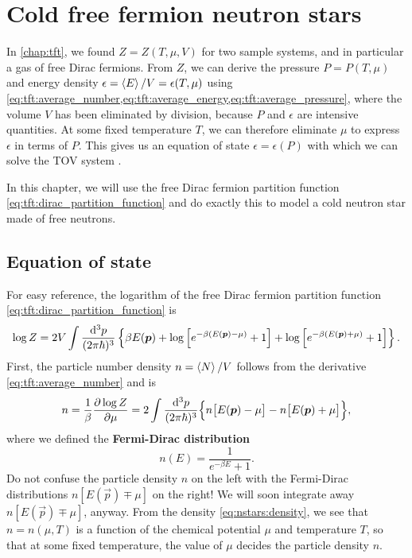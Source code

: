 \chapter{Cold free fermion neutron stars}



In \cref{chap:tft}, we found $Z = Z(T, \mu, V)$ for two sample systems, and in particular a gas of free Dirac fermions.
From $Z$, we can derive the pressure $P = P(T, \mu)$ and energy density $\epsilon = \left< E \right>/V = \epsilon(T, \mu)$ using \cref{eq:tft:average_number,eq:tft:average_energy,eq:tft:average_pressure}, where the volume $V$ has been eliminated by division, because $P$ and $\epsilon$ are intensive quantities.
At some fixed temperature $T$, we can therefore eliminate $\mu$ to express $\epsilon$ in terms of $P$.
This gives us an equation of state $\epsilon = \epsilon(P)$ with which we can solve the TOV system .

In this chapter, we will use the free Dirac fermion partition function \eqref{eq:tft:dirac_partition_function} and do exactly this to model a cold neutron star made of free neutrons.

\section{Equation of state}

For easy reference, the logarithm of the free Dirac fermion partition function \eqref{eq:tft:dirac_partition_function} is
\begin{equation}
	\log Z = 2 V \int \frac{\mathop{}\!\mathrm{d}^3 p}{(2 \pi \hbar)^3} \left\{ \beta E({\bm{p}}) + \log \left[ e^{-\beta (E({\bm{p}}) - \mu)}+1 \right] + \log \left[ e^{-\beta (E({\bm{p}}) + \mu)} + 1\right] \right\}.
\end{equation}
First, the particle number density $n = \left< N \right>/V$ follows from the derivative \eqref{eq:tft:average_number} and is
\begin{equation}
	n = 
	\frac{1}{\beta} \pdv{\log Z}{\mu} =
	2 \int \frac{\mathop{}\!\mathrm{d}^3 p}{(2 \pi \hbar)^3} \Big\{ n\big[ E({\bm{p}})-\mu \big] - n\big[ E({\bm{p}})+\mu \big] \Big\} ,
\label{eq:nstars:density}
\end{equation}
where we defined the \textbf{Fermi-Dirac distribution}
\begin{equation}
	n(E) = \frac{1}{e^{-\beta E} + 1}.
\label{eq:nstars:fermi_dirac_distribution}
\end{equation}
Do not confuse the particle density $n$ on the left with the Fermi-Dirac distributions $n[E(\vec{p}) \mp \mu]$ on the right!
We will soon integrate away $n[E(\vec{p}) \mp \mu]$, anyway.
From the density \eqref{eq:nstars:density}, we see that $n = n(\mu, T)$ is a function of the chemical potential $\mu$ and temperature $T$, so that at some fixed temperature, the value of $\mu$ decides the particle density $n$.

